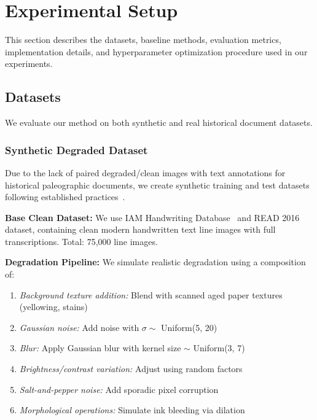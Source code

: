 \documentclass[journal]{IEEEtran}
\begin{document}
\section{Experimental Setup}

This section describes the datasets, baseline methods, evaluation metrics, implementation details, and hyperparameter optimization procedure used in our experiments.

\subsection{Datasets}

We evaluate our method on both synthetic and real historical document datasets.

\subsubsection{Synthetic Degraded Dataset}

Due to the lack of paired degraded/clean images with text annotations for historical paleographic documents, we create synthetic training and test datasets following established practices~\cite{souibgui2021enhance,zhao2019document}.

\textbf{Base Clean Dataset:} We use IAM Handwriting Database~\cite{marti2002iam} and READ 2016 dataset, containing clean modern handwritten text line images with full transcriptions. Total: 75,000 line images.

\textbf{Degradation Pipeline:} We simulate realistic degradation using a composition of:
\begin{enumerate}
    \item \textit{Background texture addition:} Blend with scanned aged paper textures (yellowing, stains)
    \item \textit{Gaussian noise:} Add noise with $\sigma \sim$ Uniform(5, 20)
    \item \textit{Blur:} Apply Gaussian blur with kernel size $\sim$ Uniform(3, 7)
    \item \textit{Brightness/contrast variation:} Adjust using random factors
    \item \textit{Salt-and-pepper noise:} Add sporadic pixel corruption
    \item \textit{Morphological operations:} Simulate ink bleeding via dilation
\end{enumerate}
\end{document}
